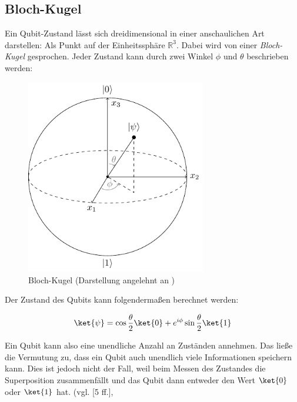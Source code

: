 \subsection{Bloch-Kugel}\label{subsec:blockkugel}
Ein Qubit-Zustand lässt sich dreidimensional in einer anschaulichen Art darstellen: Als Punkt auf der Einheitssphäre $ \mathbb{R}^ 3 $. Dabei wird von einer \emph{Bloch-Kugel} gesprochen. Jeder Zustand
kann durch zwei Winkel $\phi$ und $\theta$ beschrieben werden:

\begin{figure}[H]
  \centering
  \includegraphics[width=0.7\textwidth]{images/quantum-information/bloch.pdf}
  \caption{Bloch-Kugel (Darstellung angelehnt an \cite{riebesell_scientific_2022})}\label{fig:bloch-sphere}
\end{figure}

Der Zustand des Qubits kann folgendermaßen berechnet werden:

\begin{equation}
  \ket{\psi} = \cos\frac{\theta}{2} \ket{0} + e^{i\phi} \sin\frac{\theta}{2} \ket{1}
\end{equation}

Ein Qubit kann also eine unendliche Anzahl an Zuständen annehmen. Das ließe die Vermutung zu, dass ein Qubit auch unendlich viele Informationen speichern kann. Dies ist jedoch nicht der Fall, weil beim Messen des Zustandes die Superposition zusammenfällt und das Qubit dann entweder den Wert $\ket{0}$ oder $\ket{1}$ hat. (vgl. [5 ff.]\cite{pattanayakQuantumMachineLearning2017}, \cite[15 f.]{nielsen_quantum_2010}

